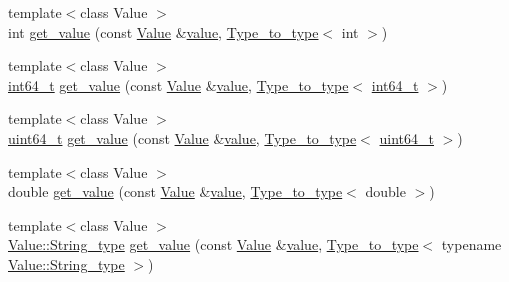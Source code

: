 \begin{DoxyCompactItemize}
\item 
{\footnotesize template$<$class Value $>$ }\\int \hyperlink{namespacejson__spirit_1_1internal___a4051677c7ad7b34f786fda82e59aae26}{get\+\_\+value} (const \hyperlink{namespacejson__spirit_a28e6abc99fda7b06c430ca38802527a3}{Value} \&\hyperlink{cache_8cc_a0f61d63b009d0880a89c843bd50d8d76}{value}, \hyperlink{structjson__spirit_1_1internal___1_1_type__to__type}{Type\+\_\+to\+\_\+type}$<$ int $>$)
\item 
{\footnotesize template$<$class Value $>$ }\\\hyperlink{stdint_8h_adec1df1b8b51cb32b77e5b86fff46471}{int64\+\_\+t} \hyperlink{namespacejson__spirit_1_1internal___a85446237bd702aa56a84ea12262b024c}{get\+\_\+value} (const \hyperlink{namespacejson__spirit_a28e6abc99fda7b06c430ca38802527a3}{Value} \&\hyperlink{cache_8cc_a0f61d63b009d0880a89c843bd50d8d76}{value}, \hyperlink{structjson__spirit_1_1internal___1_1_type__to__type}{Type\+\_\+to\+\_\+type}$<$ \hyperlink{stdint_8h_adec1df1b8b51cb32b77e5b86fff46471}{int64\+\_\+t} $>$)
\item 
{\footnotesize template$<$class Value $>$ }\\\hyperlink{stdint_8h_aaa5d1cd013383c889537491c3cfd9aad}{uint64\+\_\+t} \hyperlink{namespacejson__spirit_1_1internal___a696065019a46e1743de74d73cca8134e}{get\+\_\+value} (const \hyperlink{namespacejson__spirit_a28e6abc99fda7b06c430ca38802527a3}{Value} \&\hyperlink{cache_8cc_a0f61d63b009d0880a89c843bd50d8d76}{value}, \hyperlink{structjson__spirit_1_1internal___1_1_type__to__type}{Type\+\_\+to\+\_\+type}$<$ \hyperlink{stdint_8h_aaa5d1cd013383c889537491c3cfd9aad}{uint64\+\_\+t} $>$)
\item 
{\footnotesize template$<$class Value $>$ }\\double \hyperlink{namespacejson__spirit_1_1internal___a09fae346c76d073ff452de5c27ffbd4c}{get\+\_\+value} (const \hyperlink{namespacejson__spirit_a28e6abc99fda7b06c430ca38802527a3}{Value} \&\hyperlink{cache_8cc_a0f61d63b009d0880a89c843bd50d8d76}{value}, \hyperlink{structjson__spirit_1_1internal___1_1_type__to__type}{Type\+\_\+to\+\_\+type}$<$ double $>$)
\item 
{\footnotesize template$<$class Value $>$ }\\\hyperlink{classjson__spirit_1_1_value__impl_a7af638128a4e0dd86ab33c989c3e5ebf}{Value\+::\+String\+\_\+type} \hyperlink{namespacejson__spirit_1_1internal___a266bd313e6ca19ab3f4026916bf2f54f}{get\+\_\+value} (const \hyperlink{namespacejson__spirit_a28e6abc99fda7b06c430ca38802527a3}{Value} \&\hyperlink{cache_8cc_a0f61d63b009d0880a89c843bd50d8d76}{value}, \hyperlink{structjson__spirit_1_1internal___1_1_type__to__type}{Type\+\_\+to\+\_\+type}$<$ typename \hyperlink{classjson__spirit_1_1_value__impl_a7af638128a4e0dd86ab33c989c3e5ebf}{Value\+::\+String\+\_\+type} $>$)

\end{DoxyCompactItemize}
